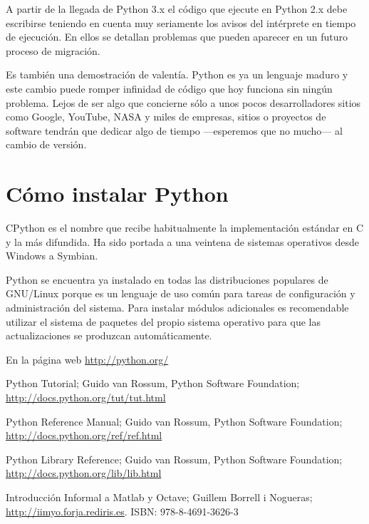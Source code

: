\documentclass[a4paper,10pt]{article}
\begin{document}
A partir de la llegada de Python 3.x el código que ejecute en Python
2.x debe escribirse teniendo en cuenta muy seriamente los avisos del
intérprete en tiempo de ejecución.  En ellos se detallan problemas que
pueden aparecer en un futuro proceso de migración.

Es también una demostración de valentía.  Python es ya un lenguaje
maduro y este cambio puede romper infinidad de código que hoy funciona
sin ningún problema.  Lejos de ser algo que concierne sólo a unos
pocos desarrolladores sitios como Google, YouTube, NASA y miles de
empresas, sitios o proyectos de software tendrán que dedicar algo de
tiempo ---esperemos que no mucho--- al cambio de versión.

\section{Cómo instalar Python}
\label{sec:instalar}

CPython es el nombre que recibe habitualmente la implementación
estándar en C y la más difundida. Ha sido portada a una veintena de
sistemas operativos desde Windows a Symbian.

Python se encuentra ya instalado en todas las distribuciones populares
de GNU/Linux porque es un lenguaje de uso común para tareas de
configuración y administración del sistema.  Para instalar módulos
adicionales es recomendable utilizar el sistema de paquetes del propio
sistema operativo para que las actualizaciones se produzcan
automáticamente.

En la página web \url{http://python.org/}


\begin{thebibliography}{99}

  Python Tutorial; Guido van Rossum, Python Software Foundation;
  \newblock \url{http://docs.python.org/tut/tut.html}

  Python Reference Manual; Guido van Rossum, Python Software Foundation;
  \newblock \url{http://docs.python.org/ref/ref.html}

  Python Library Reference; Guido van Rossum, Python Software Foundation;
  \newblock \url{http://docs.python.org/lib/lib.html}

  Introducción Informal a Matlab y Octave; Guillem Borrell i Nogueras;
  \newblock \url{http://iimyo.forja.rediris.es}. ISBN: 978-8-4691-3626-3

\end{thebibliography}
\end{document}
